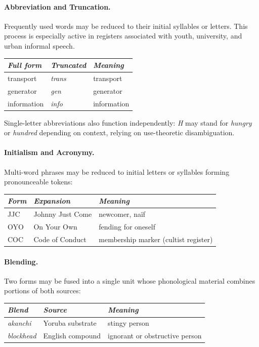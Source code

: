 \documentclass[12pt]{article}
\begin{document}
\paragraph{Abbreviation and Truncation.}
Frequently used words may be reduced to their initial syllables or letters. This process is especially active in registers associated with youth, university, and urban informal speech.

\begin{center}
\begin{tabular}{lll}
\textit{Full form} & \textit{Truncated} & \textit{Meaning} \\
\hline
transport & \textit{trans} & transport \\
generator & \textit{gen} & generator \\
information & \textit{info} & information \\
\end{tabular}
\end{center}

Single-letter abbreviations also function independently: \textit{H} may stand for \textit{hungry} or \textit{hundred} depending on context, relying on use-theoretic disambiguation.

\paragraph{Initialism and Acronymy.}
Multi-word phrases may be reduced to initial letters or syllables forming pronounceable tokens:

\begin{center}
\begin{tabular}{lll}
\textit{Form} & \textit{Expansion} & \textit{Meaning} \\
\hline
JJC & Johnny Just Come & newcomer, na\"{i}f \\
OYO & On Your Own & fending for oneself \\
COC & Code of Conduct & membership marker (cultist register) \\
\end{tabular}
\end{center}

\paragraph{Blending.}
Two forms may be fused into a single unit whose phonological material combines portions of both sources:

\begin{center}
\begin{tabular}{lll}
\textit{Blend} & \textit{Source} & \textit{Meaning} \\
\hline
\textit{akanchi} & Yoruba substrate & stingy person \\
\textit{blockhead} & English compound & ignorant or obstructive person \\
\end{tabular}
\end{center}
\end{document}
